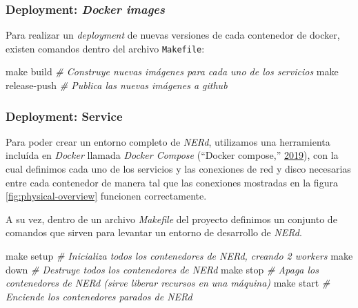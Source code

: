 \documentclass[12pt,a4paper,]{scrartcl}
\newenvironment{Shaded}{\begin{snugshade}}{\end{snugshade}}
\newcommand{\CommentTok}[1]{\textcolor[rgb]{0.56,0.35,0.01}{\textit{#1}}}
\newcommand{\FunctionTok}[1]{\textcolor[rgb]{0.00,0.00,0.00}{#1}}
\newcommand{\NormalTok}[1]{#1}
\begin{document}
\hypertarget{deployment-docker-images}{%
\subsubsection{\texorpdfstring{Deployment: \emph{Docker images}}{Deployment: Docker images}}\label{deployment-docker-images}}

Para realizar un \emph{deployment} de nuevas versiones de cada contenedor de docker, existen comandos dentro del archivo \texttt{Makefile}:

\begin{Shaded}
\begin{Highlighting}[]
\FunctionTok{make}\NormalTok{ build }\CommentTok{# Construye nuevas imágenes para cada uno de los servicios}
\FunctionTok{make}\NormalTok{ release-push }\CommentTok{# Publica las nuevas imágenes a github}
\end{Highlighting}
\end{Shaded}

\hypertarget{deployment-service}{%
\subsubsection{Deployment: Service}\label{deployment-service}}

Para poder crear un entorno completo de \emph{NERd}, utilizamos una herramienta incluída en \emph{Docker} llamada \emph{Docker Compose} (``Docker compose,'' \protect\hyperlink{ref-dockercompose}{2019}), con la cual definimos cada uno de los servicios y las conexiones de red y disco necesarias entre cada contenedor de manera tal que las conexiones mostradas en la figura \ref{fig:physical-overview} funcionen correctamente.

A su vez, dentro de un archivo \emph{Makefile} del proyecto definimos un conjunto de comandos que sirven para levantar un entorno de desarrollo de \emph{NERd}.

\begin{Shaded}
\begin{Highlighting}[]
\FunctionTok{make}\NormalTok{ setup }\CommentTok{# Inicializa todos los contenedores de NERd, creando 2 workers}
\FunctionTok{make}\NormalTok{ down }\CommentTok{# Destruye todos los contenedores de NERd}
\FunctionTok{make}\NormalTok{ stop }\CommentTok{# Apaga los contenedores de NERd (sirve liberar recursos en una máquina)}
\FunctionTok{make}\NormalTok{ start }\CommentTok{# Enciende los contenedores parados de NERd}
\end{Highlighting}
\end{Shaded}
\end{document}
